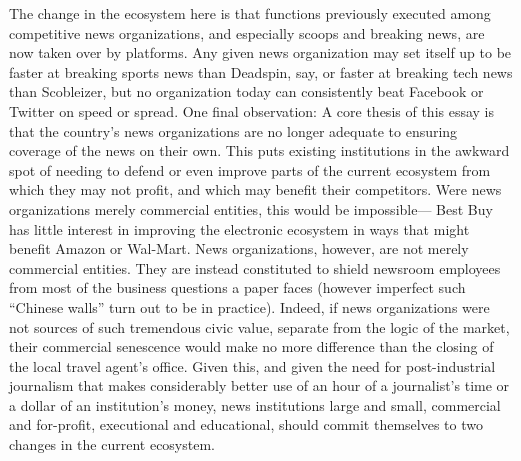 The change in the ecosystem here is that functions previously executed among
competitive news organizations, and especially scoops and breaking news, are
now taken over by platforms. Any given news organization may set itself up to
be faster at breaking sports news than Deadspin, say, or faster at breaking tech
news than Scobleizer, but no organization today can consistently beat Facebook
or Twitter on speed or spread.
One final observation: A core thesis of this essay is that the country’s news organizations
are no longer adequate to ensuring coverage of the news on their own.
This puts existing institutions in the awkward spot of needing to defend or even
improve parts of the current ecosystem from which they may not profit, and
which may benefit their competitors.
Were news organizations merely commercial entities, this would be impossible—
Best Buy has little interest in improving the electronic ecosystem in ways
that might benefit Amazon or Wal-Mart. News organizations, however, are not
merely commercial entities. They are instead constituted to shield newsroom
employees from most of the business questions a paper faces (however imperfect
such ``Chinese walls'' turn out to be in practice). Indeed, if news organizations
were not sources of such tremendous civic value, separate from the logic of the
market, their commercial senescence would make no more difference than the
closing of the local travel agent’s office.
Given this, and given the need for post-industrial journalism that makes considerably
better use of an hour of a journalist’s time or a dollar of an institution’s
money, news institutions large and small, commercial and for-profit,
executional and educational, should commit themselves to two changes in the
current ecosystem.

